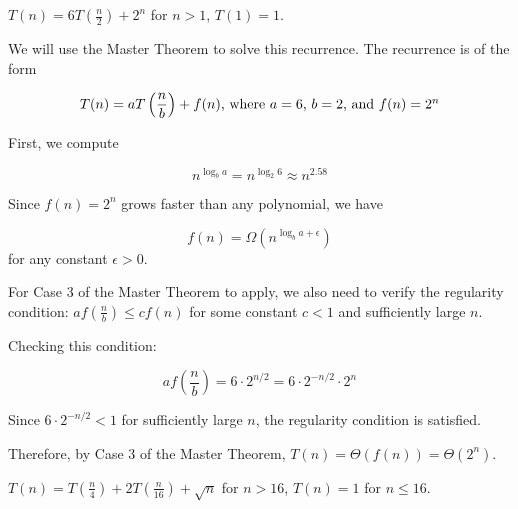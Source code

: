 \documentclass[11pt,fleqn]{exam}
\newenvironment{soln}{\color{solnblue}}{}
\newif\ifsolutions\solutionsfalse
\begin{document}
\begin{questions}

    \question[3] $T(n) = 6T\left( \frac{n}{2} \right) + 2^n$ for $n > 1$, $T(1) = 1$.

    \begin{soln}
        We will use the Master Theorem to solve this recurrence. 
        The recurrence is of the form 
        
        \[T(n) = aT\left( \frac{n}{b} \right) + f(n)$, where $a = 6$, $b = 2$, and $f(n) = 2^n\]

        First, we compute 
        
        \[n^{\log_b a} = n^{\log_2 6} \approx n^{2.58}\]

        Since $f(n) = 2^n$ grows faster than any polynomial, we have 

        \[f(n) = \Omega(n^{\log_b a + \epsilon})\] for any constant $\epsilon > 0$.

        For Case 3 of the Master Theorem to apply, we also need to verify the regularity condition:
        $af\left(\frac{n}{b}\right) \leq cf(n)$ for some constant $c < 1$ and sufficiently large $n$.

        Checking this condition:

        \[af\left(\frac{n}{b}\right) = 6 \cdot 2^{n/2} = 6 \cdot 2^{-n/2} \cdot 2^n\]

        Since $6 \cdot 2^{-n/2} < 1$ for sufficiently large $n$, the regularity condition is satisfied.

        Therefore, by Case 3 of the Master Theorem, $T(n) = \Theta(f(n)) = \Theta(2^n)$.
    \end{soln}

    \ifsolutions\fi 

    \question[3] $T(n) = T\left( \frac{n}{4} \right) + 2T\left( \frac{n}{16} \right) + \sqrt{n}$ for $n > 16$, $T(n) = 1$ for $n \le 16$.


\end{questions}
\end{document}
